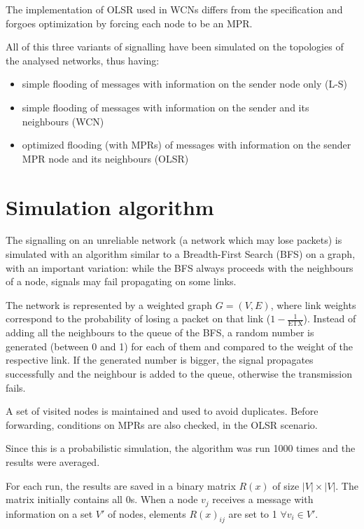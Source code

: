 \documentclass[oneside,openany]{memoir}
\newcommand{\etx}{\mathrm{ETX}}
\begin{document}
The implementation of OLSR used in WCNs differs from the specification
and forgoes optimization by forcing each node to be an MPR.

All of this three variants of signalling have been simulated on the
topologies of the analysed networks, thus having:

\begin{itemize}
\itemsep1pt\parskip0pt
\item
  simple flooding of messages with information on the sender node only
  (L-S)
\item
  simple flooding of messages with information on the sender and its
  neighbours (WCN)
\item
  optimized flooding (with MPRs) of messages with information on the
  sender MPR node and its neighbours (OLSR)
\end{itemize}

\section{Simulation algorithm}\label{simulation-algorithm}

The signalling on an unreliable network (a network which may lose
packets) is simulated with an algorithm similar to a Breadth-First
Search (BFS) on a graph, with an important variation: while the BFS
always proceeds with the neighbours of a node, signals may fail
propagating on some links.

The network is represented by a weighted graph $G=(V, E)$, where link
weights correspond to the probability of losing a packet on that link
($1 - \frac{1}{\etx}$). Instead of adding all the neighbours to the
queue of the BFS, a random number is generated (between 0 and 1) for
each of them and compared to the weight of the respective link. If the
generated number is bigger, the signal propagates successfully and the
neighbour is added to the queue, otherwise the transmission fails.

A set of visited nodes is maintained and used to avoid duplicates.
Before forwarding, conditions on MPRs are also checked, in the OLSR
scenario.

Since this is a probabilistic simulation, the algorithm was run 1000
times and the results were averaged.

For each run, the results are saved in a binary matrix $R(x)$ of size
$|V| \times |V|$. The matrix initially contains all 0s. When a node
$v_j$ receives a message with information on a set $V'$ of nodes,
elements $R(x)_{ij}$ are set to 1 $\forall v_i \in V'$.
\end{document}
